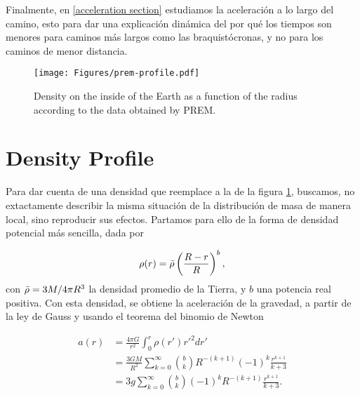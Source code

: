 \documentclass[aps,twocolumn,showpacs,preprintnumbers]{revtex4}
\begin{document}
    Finalmente, en \ref{acceleration section} estudiamos la aceleración a lo largo del camino, esto para dar una explicación dinámica del por qué los tiempos son menores para caminos más largos como las braquistócronas, y no para los caminos de menor distancia.
    
    

    \begin{figure}
        \centering
        \texttt{[image: Figures/prem-profile.pdf]}
        \caption{Density on the inside of the Earth as a function of the radius according to the data obtained by PREM.}
        \label{fig:Prem density}
    \end{figure}




    
\section{Density Profile}\label{density section}

    Para dar cuenta de una densidad que reemplace a la de la figura \ref{fig:Prem density}, buscamos, no extactamente describir la misma situación de la distribución de masa de manera local, sino reproducir sus efectos. Partamos para ello de la forma de densidad potencial más sencilla, dada por
    
    \begin{equation}
        \rho(r) = \Bar{\rho} \left( \frac{R-r}{R}\right)^b,
        \label{densidad general}
    \end{equation}
    con $\Bar{\rho} = 3M/4 \pi R^3$ la densidad promedio de la Tierra, y $b$ una potencia real positiva. Con esta densidad, se obtiene la aceleración de la gravedad, a partir de la ley de Gauss y usando el teorema del binomio de Newton
    
    \begin{align*}
          a (r) &= \frac{4 \pi G}{r^2}  \int_0^r \rho (r') {r'}^2 dr' \\
          &= \frac{3 GM}{R^2} \sum_{k=0}^{\infty} \binom{b}{k} R^{-(k+1)} (-1)^k \frac{r^{k+1}}{k+3} \\
          &= 3g  \sum_{k=0}^{\infty} \binom{b}{k} (-1)^k R^{-(k+1)}  \frac{r^{k+1}}{k+3} .
    \end{align*}
\end{document}
